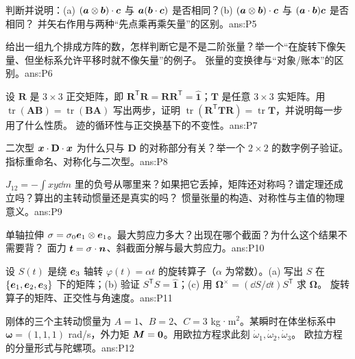 \documentclass[11pt]{ctexart}
\newcommand{\ten}[1]{\mathbf{#1}}
\newcommand{\unitd}{\hat{\ten{1}}}
\newcommand{\tr}{\operatorname{tr}}
\let\orighdr\hdr
\renewcommand{\hdr}[2]{\par\needspace{10\baselineskip}\orighdr{#1}{#2}}
\begin{document}
{判断并说明：(a) $(\boldsymbol{a}\otimes\boldsymbol{b})\cdot\boldsymbol{c}$ 与 $\boldsymbol{a}(\boldsymbol{b}\cdot\boldsymbol{c})$ 是否相同？(b) $(\boldsymbol{a}\otimes\boldsymbol{b})\cdot\boldsymbol{c}$ 与 $(\boldsymbol{a}\cdot\boldsymbol{b})\boldsymbol{c}$ 是否相同？}
{并矢右作用与两种“先点乘再乘矢量”的区别。}{ans:P5}

{给出一组九个排成方阵的数，怎样判断它是不是二阶张量？举一个“在旋转下像矢量、但坐标系允许平移时就不像矢量”的例子。}
{张量的变换律与“对象/账本”的区别。}{ans:P6}

{设 $\ten R$ 是 $3\times3$ 正交矩阵，即 $\ten R^{\mathsf T}\ten R=\ten R\ten R^{\mathsf T}=\unitd$；$\ten T$ 是任意 $3\times3$ 实矩阵。用 $\tr(\ten A\ten B)=\tr(\ten B\ten A)$ 写出两步，证明 $\tr(\ten R^{\mathsf T}\ten T\ten R)=\tr\ten T$，并说明每一步用了什么性质。}
{迹的循环性与正交换基下的不变性。}{ans:P7}

{二次型 $\vect x\cdot\ten D\cdot\vect x$ 为什么只与 $\ten D$ 的对称部分有关？举一个 $2\times2$ 的数字例子验证。}
{指标重命名、对称化与二次型。}{ans:P8}

{$J_{12}=-\int xy\dd m$ 里的负号从哪里来？如果把它丢掉，矩阵还对称吗？谱定理还成立吗？算出的主转动惯量还是真实的吗？}
{惯量张量的构造、对称性与主值的物理意义。}{ans:P9}

{单轴拉伸 $\ten\sigma=\sigma_0\vect e_1\otimes\vect e_1$。最大剪应力多大？出现在哪个截面？为什么这个结果不需要背？}
{面力 $\vect t=\ten\sigma\cdot\vect n$、斜截面分解与最大剪应力。}{ans:P10}

{设 $S(t)$ 是绕 $\boldsymbol{e}_3$ 轴转 $\varphi(t)=\alpha t$ 的旋转算子（$\alpha$ 为常数）。(a) 写出 $S$ 在 $\{\boldsymbol{e}_1,\boldsymbol{e}_2,\boldsymbol{e}_3\}$ 下的矩阵；(b) 验证 $S^{\mathsf T}S=\unitd$；(c) 用 $\boldsymbol\Omega^{\times}=(\dd S/\dd t)S^{\mathsf T}$ 求 $\boldsymbol\Omega$。}
{旋转算子的矩阵、正交性与角速度。}{ans:P11}

{刚体的三个主转动惯量为 $A=1$、$B=2$、$C=3$ kg·m$^2$。某瞬时在体坐标系中 $\boldsymbol\omega=(1,1,1)$ rad/s，外力矩 $\boldsymbol{M}=\boldsymbol{0}$。用欧拉方程求此刻 $\dot\omega_1,\dot\omega_2,\dot\omega_3$。}
{欧拉方程的分量形式与陀螺项。}{ans:P12}

\label{sec:review}
\end{document}
